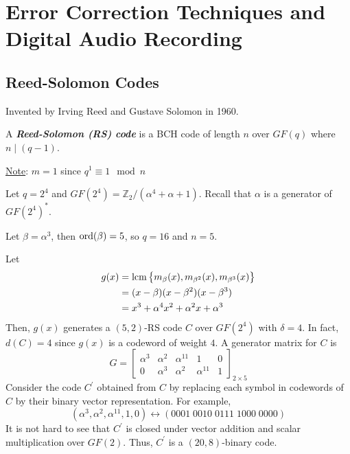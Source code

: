 \chapter{Error Correction Techniques and Digital Audio Recording}
\section{Reed-Solomon Codes}
Invented by Irving Reed and Gustave Solomon in 1960.
\begin{defbox}
    \begin{definition}
        A \textbf{\emph{Reed-Solomon (RS) code}} is a BCH code
        of length $ n $ over $ GF(q) $ where $ n\mid (q-1) $.

        \underline{Note}: $ m=1 $ since $ q^1\equiv 1\mod n $
    \end{definition}
\end{defbox}
\begin{exbox}
    \begin{example}
        Let $ q=2^4 $ and $ GF(2^4)=\mathbb{Z}_2/(\alpha^4+\alpha+1) $.
        Recall that $ \alpha $ is a generator of $ GF(2^4)^* $.

        Let $ \beta=\alpha^3 $, then $ \operatorname{ord}(\beta)=5 $, so $ q=16 $
        and $ n=5 $.

        Let
        \begin{align*}
            g(x) & =\operatorname{lcm} \left\{ m_{\beta}(x),m_{\beta^2}(x),m_{\beta^3}(x)\right\} \\
                 & =(x-\beta)(x-\beta^2)(x-\beta^3)                                 \\
                 & =x^3+\alpha^4x^2+\alpha^2x+\alpha^3
        \end{align*}
        Then, $ g(x) $ generates a $ (5,2) $-RS code $ C $ over $ GF(2^4) $
        with $ \delta=4 $. In fact, $ d(C)=4 $ since $ g(x) $
        is a codeword of weight $ 4 $. A generator matrix for $ C $ is
        \[ G=
            \begin{bmatrix}
                \alpha^3 & \alpha^2 & \alpha^{11} & 1           & 0 \\
                0        & \alpha^3 & \alpha^2    & \alpha^{11} & 1
            \end{bmatrix}_{2\times 5} \]
        Consider the code $ C^{\prime} $ obtained from $ C $
        by replacing each symbol in codewords of $ C $ by their binary vector representation.
        For example,
        \[ (\alpha^3,\alpha^2,\alpha^{11},1,0)\longleftrightarrow (0001\; 0010\; 0111\; 1000\; 0000) \]
        It is not hard to see that $ C^{\prime} $ is closed under vector addition and scalar
        multiplication over $ GF(2) $. Thus, $ C^{\prime} $ is a $ (20,8) $-binary code.
    \end{example}
\end{exbox}

